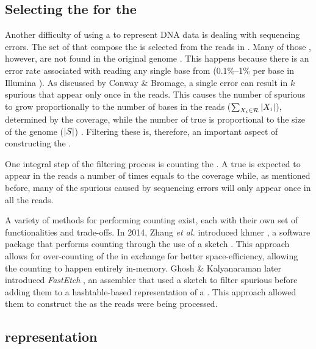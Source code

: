 \subsection{Selecting the  for the \dBG}
\label{subsec:dBG-selectingkmers}

Another difficulty of using a \dBG to represent DNA data is dealing with sequencing errors. The set of  that compose the \dBG is selected from the reads in \readset. Many of those , however, are not found in the original genome . This happens because there is an error rate associated with reading any single base from  (0.1\%--1\% per base in Illumina \cite{Metzker2010}). As discussed by Conway \& Bromage, a single error can result in $k$ spurious  that appear only once in the reads. This causes the number of spurious  to grow proportionally to the number of bases in the reads ($\sum_{\strname{X}_i \in \readset} |\strname{X}_i|$), determined by the coverage, while the number of true  is proportional to the size of the genome ($|\strname{S}|$) \cite{Conway2011}. Filtering these  is, therefore, an important aspect of constructing the \dBG.

One integral step of the filtering process is counting the . A true \kmer is expected to appear in the reads a number of times equals to the coverage while, as mentioned before, many of the spurious  caused by sequencing errors will only appear once in all the reads.

A variety of methods for performing \kmer counting exist, each with their own set of functionalities and trade-offs. In 2014, Zhang \emph{et al.} introduced khmer \cite{Zhang2014}, a software package that performs \kmer counting through the use of a \cm sketch . This approach allows for over-counting of the  in exchange for better space-efficiency, allowing the counting to happen entirely in-memory. Ghosh \& Kalyanaraman later introduced \emph{FastEtch} \cite{Ghosh2019}, an assembler that used a \cm sketch to filter spurious  before adding them to a hashtable-based representation of a \dBG. This approach allowed them to construct the \dBG as the reads were being processed.

\subsection{\dBG representation}
\label{subsec:dBG-representation}

